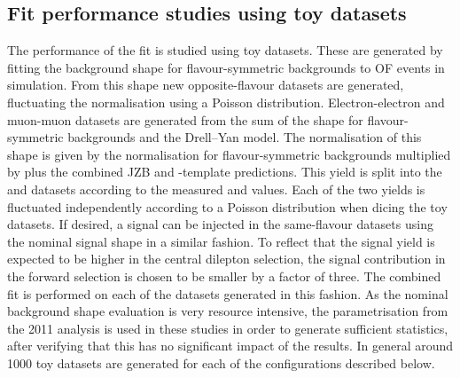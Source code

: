 \subsection{Fit performance studies using toy datasets}
\label{sec:toys}
The performance of the fit is studied using toy datasets. These are generated by fitting the background shape for flavour-symmetric backgrounds to OF events in simulation. From this shape new opposite-flavour datasets are generated, fluctuating the normalisation using a Poisson distribution. Electron-electron and muon-muon datasets are generated from the sum of the  shape for flavour-symmetric backgrounds and the Drell--Yan model. The normalisation of this shape is given by the normalisation for flavour-symmetric backgrounds multiplied by \Rsfof plus the combined JZB and \MET-template predictions. This yield is split into the \EE and \MM datasets according to the measured \Reeof and \Rmmof values. Each of the two yields is fluctuated independently according to a Poisson distribution when dicing the toy datasets. If desired, a signal can be injected in the same-flavour datasets using the nominal signal shape in a similar fashion. To reflect that the signal yield is expected to be higher in the central dilepton selection, the signal contribution in the forward selection is chosen to be smaller by a factor of three. The combined fit is performed on each of the datasets generated in this fashion. As the nominal background shape evaluation is very resource intensive, the parametrisation from the 2011 analysis is used in these studies in order to generate sufficient statistics, after verifying that this has no significant impact of the results. In general around 1000 toy datasets are generated for each of the configurations described below.
